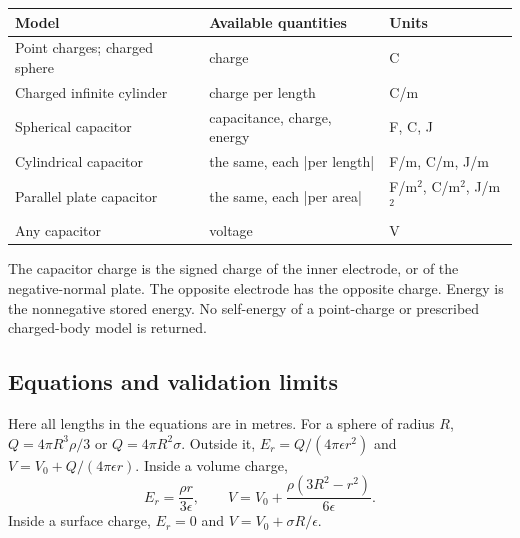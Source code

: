 \begin{center}\small
\begin{tabular}{lll}
Model & Available quantities & Units\\\hline
Point charges; charged sphere & charge & C\\
Charged infinite cylinder & charge per length & C/m\\
Spherical capacitor & capacitance, charge, energy & F, C, J\\
Cylindrical capacitor & the same, each |per length| & F/m, C/m, J/m\\
Parallel plate capacitor & the same, each |per area| & F/m$^2$, C/m$^2$, J/m$^2$\\
Any capacitor & voltage & V
\end{tabular}
\end{center}
The capacitor charge is the signed charge of the inner electrode, or of the
negative-normal plate. The opposite electrode has the opposite charge. Energy
is the nonnegative stored energy. No self-energy of a point-charge or prescribed
charged-body model is returned.

\begin{codeexample}[width=0pt]
\end{codeexample}

\subsection{Equations and validation limits}
\label{sec:electric-classic-methods}
Here all lengths in the equations are in metres. For a sphere of radius $R$,
$Q=4\pi R^3\rho/3$ or $Q=4\pi R^2\sigma$. Outside it,
$E_r=Q/(4\pi\epsilon r^2)$ and $V=V_0+Q/(4\pi\epsilon r)$.
Inside a volume charge,
\[
 E_r=\frac{\rho r}{3\epsilon},\qquad
 V=V_0+\frac{\rho(3R^2-r^2)}{6\epsilon}.
\]
Inside a surface charge, $E_r=0$ and $V=V_0+\sigma R/\epsilon$.

